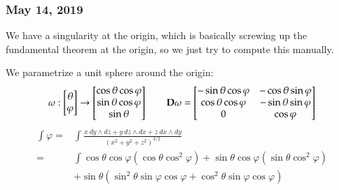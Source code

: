 \subsubsection*{May 14, 2019}

We have a singularity at the origin, which is basically screwing up the fundamental theorem at the origin, so we just try to compute this manually. 

We parametrize a unit sphere around the origin: 
\[\omega : \begin{bmatrix} \theta \\ \varphi \end{bmatrix} \to \begin{bmatrix} \cos\theta\cos\varphi \\ \sin\theta\cos\varphi \\ \sin\theta \end{bmatrix} \qquad \textbf{D}\omega = \begin{bmatrix} -\sin\theta\cos\varphi & -\cos\theta\sin\varphi \\ \cos\theta\cos\varphi & -\sin\theta\sin\varphi \\ 0 & \cos\varphi \end{bmatrix} \]
\begin{align*}
	\int\varphi =& \int \frac{x\ dy\wedge dz + y\ dz\wedge dx + z\ dx\wedge dy}{(x^2+y^2+z^2)^{3/2}} \\
	=& \int \cos\theta \cos\varphi (\cos\theta\cos^2\varphi) + \sin\theta \cos\varphi (\sin \theta \cos^2 \varphi) \\
	&+ \sin\theta (\sin^2\theta \sin\varphi \cos\varphi + \cos^2\theta \sin\varphi \cos\varphi)
	\end{align*}